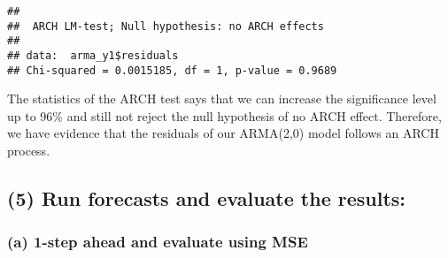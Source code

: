 \documentclass[]{article}
\newenvironment{Shaded}{\begin{snugshade}}{\end{snugshade}}
\newcommand{\AttributeTok}[1]{\textcolor[rgb]{0.77,0.63,0.00}{#1}}
\newcommand{\DecValTok}[1]{\textcolor[rgb]{0.00,0.00,0.81}{#1}}
\newcommand{\FunctionTok}[1]{\textcolor[rgb]{0.00,0.00,0.00}{#1}}
\newcommand{\NormalTok}[1]{#1}
\newcommand{\SpecialCharTok}[1]{\textcolor[rgb]{0.00,0.00,0.00}{#1}}
\begin{document}
\begin{Shaded}
\end{Shaded}

\begin{verbatim}
## 
##  ARCH LM-test; Null hypothesis: no ARCH effects
## 
## data:  arma_y1$residuals
## Chi-squared = 0.0015185, df = 1, p-value = 0.9689
\end{verbatim}

The statistics of the ARCH test says that we can increase the
significance level up to 96\% and still not reject the null hypothesis
of no ARCH effect. Therefore, we have evidence that the residuals of our
ARMA(2,0) model follows an ARCH process.

\hypertarget{run-forecasts-and-evaluate-the-results}{%
\subsection{\texorpdfstring{\textbf{(5)} Run forecasts and evaluate the
results:}{(5) Run forecasts and evaluate the results:}}\label{run-forecasts-and-evaluate-the-results}}

\hypertarget{a-1-step-ahead-and-evaluate-using-mse}{%
\subsubsection{\texorpdfstring{\textbf{(a)} 1-step ahead and evaluate
using
MSE}{(a) 1-step ahead and evaluate using MSE}}\label{a-1-step-ahead-and-evaluate-using-mse}}
\end{document}
